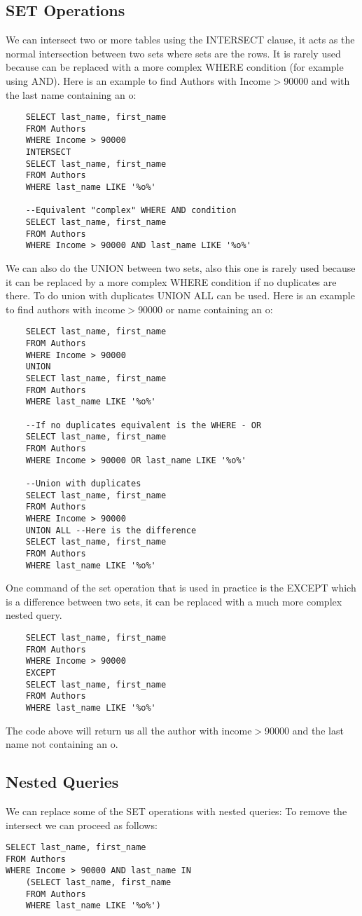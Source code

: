 \documentclass[a4page, 11pt]{article}
\begin{document}
\subsection{SET Operations}
We can intersect two or more tables using the INTERSECT clause, it acts as the normal intersection between two sets where sets are the rows. 
It is rarely used because can be replaced with a more complex WHERE condition (for example using AND). 
Here is an example to find Authors with Income$>$90000 and with the last name containing an o:
\begin{lstlisting}
	SELECT last_name, first_name
	FROM Authors
	WHERE Income > 90000
	INTERSECT 
	SELECT last_name, first_name
	FROM Authors
	WHERE last_name LIKE '%o%' 
	
	--Equivalent "complex" WHERE AND condition
	SELECT last_name, first_name
	FROM Authors
	WHERE Income > 90000 AND last_name LIKE '%o%'
\end{lstlisting}
We can also do the UNION between two sets, also this one is rarely used because it can be replaced by a more complex WHERE condition if no duplicates are there. To do union with duplicates UNION ALL can be used. 
Here is an example to find authors with income$>$90000 or name containing an o:
\begin{lstlisting}
	SELECT last_name, first_name
	FROM Authors
	WHERE Income > 90000
	UNION 
	SELECT last_name, first_name
	FROM Authors
	WHERE last_name LIKE '%o%' 
	
	--If no duplicates equivalent is the WHERE - OR
	SELECT last_name, first_name
	FROM Authors
	WHERE Income > 90000 OR last_name LIKE '%o%'
	
	--Union with duplicates
	SELECT last_name, first_name
	FROM Authors
	WHERE Income > 90000
	UNION ALL --Here is the difference
	SELECT last_name, first_name
	FROM Authors
	WHERE last_name LIKE '%o%' 
\end{lstlisting}

One command of the set operation that is used in practice is the EXCEPT which is a difference between two sets, it can be replaced with a much more complex nested query.
\begin{lstlisting}
	SELECT last_name, first_name
	FROM Authors
	WHERE Income > 90000
	EXCEPT 
	SELECT last_name, first_name
	FROM Authors
	WHERE last_name LIKE '%o%' 
\end{lstlisting}
The code above will return us all the author with income$>$90000 and the last name not containing an o.

\subsection{Nested Queries}
We can replace some of the SET operations with nested queries:\newline
To remove the intersect we can proceed as follows:
\begin{lstlisting}
SELECT last_name, first_name
FROM Authors
WHERE Income > 90000 AND last_name IN 
	(SELECT last_name, first_name
	FROM Authors
	WHERE last_name LIKE '%o%')
\end{lstlisting}
\end{document}
